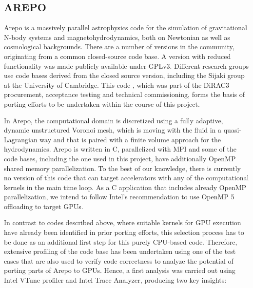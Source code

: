 





\subsection{AREPO}\label{sec:arepo}

Arepo is a massively parallel astrophysics code for the simulation of gravitational N-body systems and magnetohydrodynamics, both on Newtonian as well as cosmological backgrounds. There are a number of versions in the community, originating from a common closed-source code base. A version with reduced functionality was made publicly available under GPLv3\cite{weinberger_arepo_2020, springel_arepo_nodate}. Different research groups use code bases derived from the closed source version, including the Sijaki group at the University of Cambridge. This code \cite{sijaki_arepo_nodate}, which was part of the DiRAC3 procurement, acceptance testing and technical commissioning, forms the basis of porting efforts to be undertaken within the course of this project.

In Arepo, the computational domain is discretized using a fully adaptive, dynamic unstructured Voronoi mesh, which is moving with the fluid in a quasi-Lagrangian way and that is paired with a finite volume approach for the hydrodynamics.
Arepo is written in C, parallelized with MPI and some of the code bases, including the one used in this project, have additionally OpenMP shared memory parallelization. To the best of our knowledge, there is currently no version of this code that can target accelerators with any of the computational kernels in the main time loop.
As a C application that includes already OpenMP parallelization, we intend to follow Intel's recommendation to use OpenMP 5 offloading to target GPUs.

In contrast to codes described above, where suitable kernels for GPU execution have already been identified in prior porting efforts, this selection process has to be done as an additional first step for this purely CPU-based code. Therefore, extensive profiling of the code base has been undertaken using one of the test cases that are also used to verify code correctness to analyze the potential of porting parts of Arepo to GPUs. Hence, a first analysis was carried out using Intel VTune profiler and Intel Trace Analyzer, producing two key insights:

